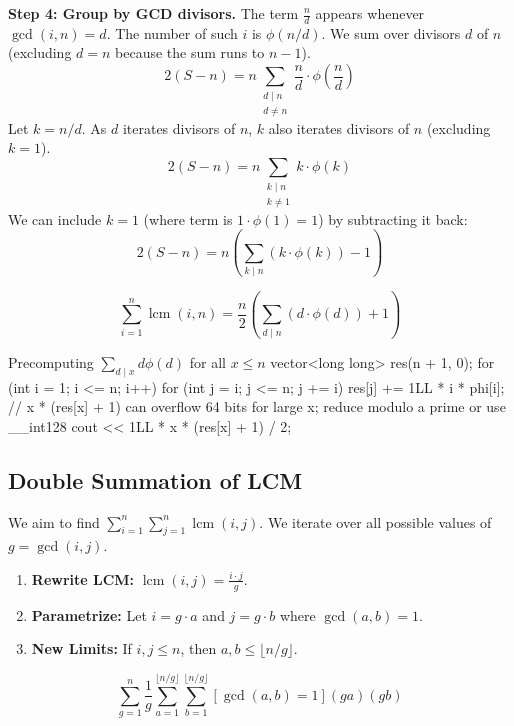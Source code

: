 \documentclass[11pt]{article}
\DeclareMathOperator{\lcm}{lcm}
\begin{document}
\textbf{Step 4: Group by GCD divisors.}
The term $\frac{n}{d}$ appears whenever $\gcd(i, n) = d$. The number of such $i$ is $\phi(n/d)$.
We sum over divisors $d$ of $n$ (excluding $d=n$ because the sum runs to $n-1$).
\[ 2(S - n) = n \sum_{\substack{d \mid n \\ d \neq n}} \frac{n}{d} \cdot \phi\left(\frac{n}{d}\right) \]
Let $k = n/d$. As $d$ iterates divisors of $n$, $k$ also iterates divisors of $n$ (excluding $k=1$).
\[ 2(S - n) = n \sum_{\substack{k \mid n \\ k \neq 1}} k \cdot \phi(k) \]
We can include $k=1$ (where term is $1 \cdot \phi(1) = 1$) by subtracting it back:
\[ 2(S - n) = n \left( \sum_{k \mid n} (k \cdot \phi(k)) - 1 \right) \]

\begin{resultbox}
    \begin{equation}
        \sum_{i=1}^n \lcm(i, n) = \frac{n}{2} \left( \sum_{d \mid n} (d \cdot \phi(d)) + 1 \right) \label{eq:lcm_result}
    \end{equation}
\end{resultbox}

\begin{vscode}{Precomputing $\sum_{d \mid x} d\phi(d)$ for all $x \le n$}
vector<long long> res(n + 1, 0);
for (int i = 1; i <= n; i++)
{
    for (int j = i; j <= n; j += i)
        res[j] += 1LL * i * phi[i];
}
// x * (res[x] + 1) can overflow 64 bits for large x; reduce modulo a prime or use __int128
cout << 1LL * x * (res[x] + 1) / 2;
\end{vscode}

\subsection{Double Summation of LCM}

We aim to find $\sum_{i=1}^n \sum_{j=1}^n \lcm(i, j)$.
We iterate over all possible values of $g = \gcd(i, j)$.

\begin{enumerate}
    \item \textbf{Rewrite LCM:} $\lcm(i, j) = \frac{i \cdot j}{g}$.
    \item \textbf{Parametrize:} Let $i = g \cdot a$ and $j = g \cdot b$ where $\gcd(a, b) = 1$.
    \item \textbf{New Limits:} If $i, j \le n$, then $a, b \le \lfloor n/g \rfloor$.
\end{enumerate}

\[ \sum_{g=1}^n \frac{1}{g} \sum_{a=1}^{\lfloor n/g \rfloor} \sum_{b=1}^{\lfloor n/g \rfloor} [\gcd(a, b) = 1] (ga)(gb) \]
\end{document}
